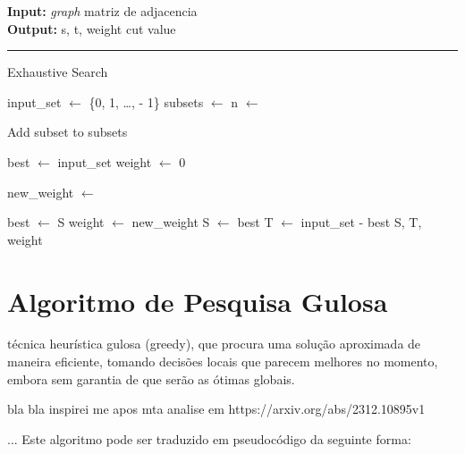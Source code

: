 \documentclass[mirror]{revdetua}
\begin{document}
\begin{algorithm}
    \raggedright
    \textbf{Input:} \textit{graph} matriz de adjacencia \\
    \textbf{Output:} s, t, weight cut value \\
    \hrule 
    \caption{Exhaustive Search}
    \begin{algorithmic}[1]
        \State input\_set $\gets$ \{0, 1, \ldots,  - 1\}
        \State subsets $\gets$ 
        \State n $\gets$ 
        
            \State Add subset to subsets
            \EndFor
        \EndFor
        
        \State best $\gets$ input\_set
        \State weight $\gets$ 0
        
            \State new\_weight $\gets$ 
            
            \State best $\gets$ S
            \State weight $\gets$ new\_weight
            \EndIf
        \EndFor
        \State S $\gets$ best
        \State T $\gets$ input\_set - best
        \State \Return S, T, weight
    \end{algorithmic}
\end{algorithm}


\section{Algoritmo de Pesquisa Gulosa}

técnica heurística gulosa (greedy), que procura uma solução aproximada de maneira eficiente, tomando decisões locais que parecem melhores no momento, embora sem garantia de que serão as ótimas globais.

bla bla inspirei me apos mta analise em https://arxiv.org/abs/2312.10895v1

... Este algoritmo pode ser traduzido em pseudocódigo da seguinte forma:
\end{document}
